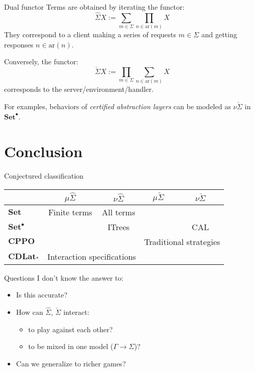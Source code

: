 \documentclass{beamer}
\newcommand{\fun}[1]{\mathrm{#1}}
\newcommand{\cat}[1]{\mathbf{#1}}
\begin{document}
\begin{frame}{Dual functor}
Terms are obtained by iterating the functor:
\[
    \hat{\Sigma} X := \sum_{m \in \Sigma} \prod_{n \in \fun{ar}(m)} X
\]
They correspond to a client making a series of requests
$m \in \Sigma$ and getting responses $n \in \fun{ar}(n)$.

Conversely, the functor:
\[
    \check{\Sigma} X := \prod_{m \in \Sigma} \sum_{n \in \fun{ar}(m)} X
\]
corresponds to the server/environment/handler.

For examples, behaviors of
\emph{certified abstraction layers}
can be modeled as $\nu \check{\Sigma}$ in $\cat{Set}^\bullet$.
\end{frame}

\section{Conclusion}

\begin{frame}[fragile]{Conjectured classification}
\begin{centering}
\begin{tabular}{l|c|c|c|c|}
  & $\mu \hat{\Sigma}$ & $\nu \hat{\Sigma}$ & $\mu \check{\Sigma}$ & $\nu \check{\Sigma}$ \\
  \hline
  $\cat{Set}$ & Finite terms & All terms & & \\
  \hline
  $\cat{Set}^\bullet$ & & ITrees & & CAL \\
  \hline
  $\cat{CPPO}$ & \multicolumn{2}{c|}{} & \multicolumn{2}{c|}{Traditional strategies} \\
  \hline
  $\cat{CDLat}_*$ & \multicolumn{2}{c|}{Interaction specifications} & \multicolumn{2}{c|}{} \\
  \hline
\end{tabular}
\end{centering}

\vfill
\pause
Questions I don't know the answer to:
\begin{itemize}
  \item Is this accurate?
  \item How can $\hat{\Sigma}$, $\check{\Sigma}$ interact:
  \begin{itemize}
    \item to play against each other?
    \item to be mixed in one model ($\Gamma \rightarrow \Sigma$)?
  \end{itemize}
  \item Can we generalize to richer games? %
\end{itemize}
\end{frame}
\end{document}
